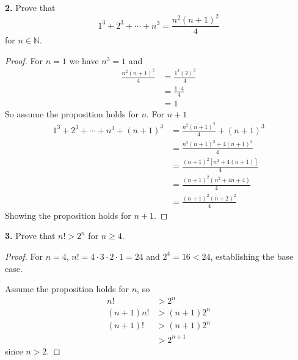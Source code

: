 \documentclass[12pt]{amsart}
\newenvironment{statement}[1]{\smallskip\noindent\color[rgb]{1.00,0.00,0.50} {\bf #1.}}{}
\theoremstyle{definition}
\theoremstyle{remark}
\newcommand{\BN}{\mathbb N}
\begin{document}
\begin{statement}{2}
  Prove that
  \begin{equation*}
        1^3 + 2^3 + \cdots + n^3 = \frac{n^2(n+1)^2}{4}
  \end{equation*}
  for $n \in \BN$.
\end{statement}
\begin{proof}
  For $n=1$ we have $n^3 = 1$ and 
  \begin{align*}
    \frac{n^2(n+1)^2}{4} &= \frac{1^2(2)^2}{4} \\
    &= \frac{1 \cdot 4}{4} \\
    &= 1
  \end{align*}
  So assume the proposition holds for $n$. For $n+1$
  \begin{align*}
    1^3 + 2^3 + \cdots + n^3 + (n+1)^3 &= \frac{n^2(n+1)^2}{4} + (n+1)^3 \\
    &= \frac{n^2(n+1)^2 + 4(n+1)^3}{4} \\
    &= \frac{(n+1)^2 [n^2 + 4(n+1)]}{4} \\
    &= \frac{(n+1)^2 (n^2 + 4n+4)}{4} \\
    &= \frac{(n+1)^2 (n + 2)^2}{4}
  \end{align*}
  Showing the proposition holds for $n+1$.
\end{proof}

\begin{statement}{3}
  Prove that $n! > 2^n$ for $n \ge 4$.
\end{statement}
\begin{proof}
  For $n=4$, $n! = 4 \cdot 3\cdot 2\cdot 1 = 24$ and $2^4 = 16 < 24$,
  establishing the base case.

  Assume the proposition holds for $n$, so 
  \begin{align*}
    n! &> 2^n \\
    (n+1) n! &> (n+1) 2^n \\
    (n+1)! &> (n+1) 2^n \\
    &> 2^{n+1}
  \end{align*}
  since $n > 2$. 
\end{proof}
\end{document}
